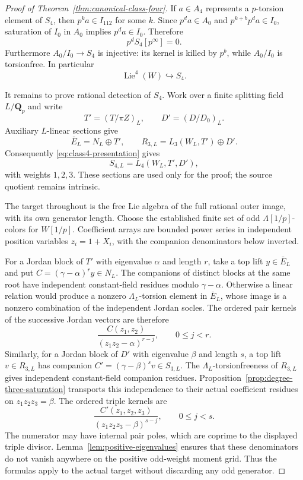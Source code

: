 \begin{proof}[Proof of Theorem~\ref{thm:canonical-class-four}]
If $a\in A_4$ represents a $p$-torsion element of $S_4$,
then $p^ka\in I_{112}$ for some $k$. Since
$p^da\in A_0$ and $p^{k+b}p^da\in I_0$, saturation
of $I_0$ in $A_0$ implies $p^da\in I_0$. Therefore
\begin{equation}\label{eq:class4-pbound}
                           p^dS_4[p^\infty]=0.
\end{equation}
Furthermore $A_0/I_0\to S_4$ is injective: its kernel
is killed by $p^b$, while $A_0/I_0$ is torsionfree.
In particular
\begin{equation}\label{eq:class4-pure-Hall}
                  \operatorname{Lie}^4(W)\hookrightarrow S_4.
\end{equation}

It remains to prove rational detection of $S_4$.
Work over a finite splitting field $L/\mathbf Q_p$ and
write
\[
 T'=(T/\pi Z)_L,\qquad D'=(D/D_0)_L.
\]
Auxiliary $L$-linear sections give
\[
 \bar E_L=N_L\oplus T',\qquad
 R_{3,L}=L_3(W_L,T')\oplus D'.
\]
Consequently \eqref{eq:class4-presentation} gives
\begin{equation}\label{eq:class4-weighted-free}
                        S_{4,L}=L_4(W_L,T',D'),
\end{equation}
with weights $1,2,3$. These sections are used only for
the proof; the source quotient remains intrinsic.

The target throughout is the free Lie algebra of the
full rational outer image, with its own generator
length. Choose the established finite set of odd
$\Lambda[1/p]$-colors for $W[1/p]$. Coefficient arrays
are bounded power series in independent position
variables $z_i=1+X_i$, with the companion denominators
below inverted.

For a Jordan block of $T'$ with eigenvalue $\alpha$
and length $r$, take a top lift $y\in\bar E_L$ and put
$C=(\gamma-\alpha)^ry\in N_L$. The companions of
distinct blocks at the same root have independent
constant-field residues modulo $\gamma-\alpha$.
Otherwise a linear relation would produce a nonzero
$\Lambda_L$-torsion element in $\bar E_L$, whose image
is a nonzero combination of the independent Jordan
socles. The ordered pair kernels of the successive
Jordan vectors are therefore
\[
              \frac{C(z_1,z_2)}{(z_1z_2-\alpha)^{r-j}},
              \qquad 0\le j<r.
\]
Similarly, for a Jordan block of $D'$ with eigenvalue
$\beta$ and length $s$, a top lift $v\in R_{3,L}$ has
companion $C'=(\gamma-\beta)^sv\in S_{3,L}$.
The $\Lambda_L$-torsionfreeness of $R_{3,L}$ gives
independent constant-field companion residues.
Proposition~\ref{prop:degree-three-saturation} transports
this independence to their actual coefficient residues
on $z_1z_2z_3=\beta$. The ordered triple kernels are
\[
        \frac{C'(z_1,z_2,z_3)}{(z_1z_2z_3-\beta)^{s-j}},
                         \qquad0\le j<s.
\]
The numerator may have internal pair poles, which are
coprime to the displayed triple divisor.
Lemma~\ref{lem:positive-eigenvalues} ensures that these
denominators do not vanish anywhere on the positive
odd-weight moment grid. Thus the formulas apply to
the actual target without discarding any odd generator.


\end{proof}
